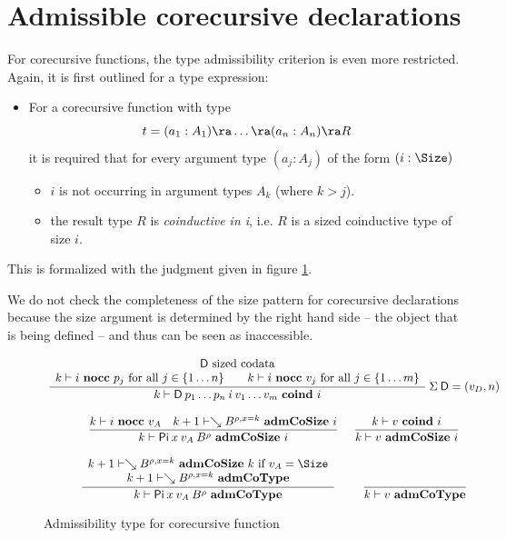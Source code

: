 \section{Admissible corecursive declarations}

For corecursive functions, the type admissibility criterion is even more restricted.
Again, it is first outlined for a type expression:
\begin{itemize}
\item
For a corecursive function with type \[t = (a_1 : A_1) \ra \ldots \ra (a_n : A_n) \ra R\] it is required that 
for every argument type $(a_j : A_j)$ of the form $(i : \Size)$  
\begin{itemize}
\item
$i$ is not occurring in argument types $A_k$ (where $k > j$). 
\item
the result type $R$ is \emph{coinductive in i}, i.e. $R$ is a sized coinductive type of size $i$. 
\end{itemize}
\end{itemize}
This is formalized with the judgment given in figure \ref{coadm}.

We do not check the completeness of the size pattern for corecursive declarations because the size argument is determined by the right hand side -- the object that is being defined -- and thus can be seen as inaccessible. 


\begin{figure}[htp]
\begin{gather*}
\ndru{}
{\DD \mbox{ sized codata}}
{\nocc{k}{i}{p_j} \mbox{ for all } j \in \{1\ldots n\} \qquad \nocc{k}{i}{v_j} \mbox{ for all } j \in \{1\ldots m\}}
{\coind{k}{\DD \: p_1 \ldots p_n \: i \: v_1 \ldots v_m}{i}}
{\: \Sig \: \DD = (v_D,n)}
\\[2ex]
\nru{}
{\nocc{k}{i}{v_A}
\quad
\admCoSize{k+1}{\wh \cl{B}{\ins{\rho}{x}{k}}}{i}}
{\admCoSize{k}{\vpi \: x \: v_A \: \cl{B}{\rho}}{i}}
\quad
\nru{}
{\coind{k}{v}{i}}
{\admCoSize{k}{v}{i}}
\\[2ex]
\ndru{}
{\admCoSize{k+1}{\wh \cl{B}{\ins{\rho}{x}{k}}}{k} \mbox{ if } v_A = \Size}
{\admCoType{k+1}{\wh \cl{B}{\ins{\rho}{x}{k}}}}
{\admCoType{k}{\vpi \: x \: v_A \: \cl{B}{\rho}}}
\qquad
\nru{}
{}
{\admCoType{k}{v}}
\end{gather*}
\caption{Admissibility type for corecursive function}
\label{coadm}
\end{figure}


